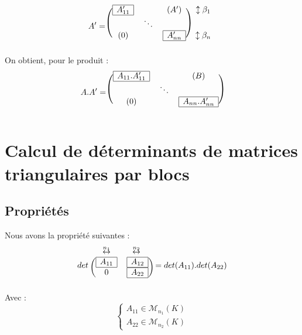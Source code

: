 \[A' = \begin{blockarray}{cccc}
        \begin{block}{(ccc)c}
         \mesbloc{A'_{11}}  &  & (A') & \updownarrow \beta_1   \\
                            &\ddots  &      &  \\
         (0)                &  & \mesbloc{A'_{nn}} & \updownarrow\beta_n   \\
        \end{block}
        \end{blockarray}
\] 
On obtient, pour le produit : 
\[A.A' = \begin{blockarray}{ccc}
        \begin{block}{(ccc)}
         \mesbloc{A_{11}.A'_{11}}  &  & (B)    \\
                            &\ddots  &        \\
         (0)                &  & \mesbloc{A_{nn}.A'_{nn}}   \\
        \end{block}
        \end{blockarray}
\] 
\section{Calcul de déterminants de matrices triangulaires par blocs}
\subsection{Propriétés}
\begin{prop}
Nous avons la propriété suivantes : 
\[det~ \begin{blockarray}{cc}
        \overset{n_1}\leftrightarrow & \overset{n_2}\leftrightarrow \\
	\begin{block}{(cc)}
         \mesbloc{A_{11}}  &  \mesbloc{A_{12}}    \\
         0   		   & \mesbloc{A_{22}}   \\
        \end{block}
        \end{blockarray} = det(A_{11}).det(A_{22})
\] 
Avec :
$$\begin{cases}
A_{11} \in  \mathcal{M}_{n_1}(K) \\  A_{22} \in  \mathcal{M}_{n_2}(K)
\end{cases}$$
\end{prop}
